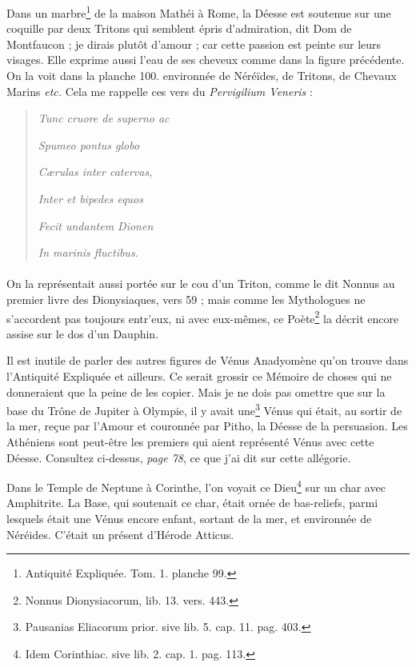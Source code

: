 \documentclass[a4paper, 18pt, oneside]{article}
\begin{document}
Dans un marbre\footnote{Antiquité Expliquée. Tom. 1. planche 99.} de la maison Mathéi à Rome, la Déesse est soutenue sur une coquille par deux Tritons qui semblent épris d'admiration, dit Dom de Montfaucon ; je dirais plutôt d'amour ; car cette passion est peinte sur leurs visages. Elle exprime aussi l'eau de ses cheveux comme dans la figure précédente. On la voit dans la planche 100. environnée de Néréïdes, de Tritons, de Chevaux Marins \emph{etc.} Cela me rappelle ces vers du \emph{Pervigilium Veneris} :
\begin{quotation}
\emph{Tunc cruore de superno ac}

\hspace*{5mm}\emph{Spumeo pontus globo}

\emph{Cærulas inter catervas,}

\hspace*{5mm}\emph{Inter et bipedes equos}

\emph{Fecit undantem Dionen}

\hspace*{5mm}\emph{In marinis fluctibus.}
\end{quotation}
\paragraph{}
On la représentait aussi portée sur le cou d'un Triton, comme le dit Nonnus au premier livre des Dionysiaques, vers 59 ; mais comme les Mythologues ne s'accordent pas toujours entr'eux, ni avec eux-mêmes, ce Poète\footnote{Nonnus Dionysiacorum, lib. 13. vers. 443.} la décrit encore assise sur le dos d'un Dauphin.

Il est inutile de parler des autres figures de Vénus Anadyomène qu'on trouve dans l'Antiquité Expliquée et ailleurs. Ce serait grossir ce Mémoire de choses qui ne donneraient que la peine de les copier. Mais je ne dois pas omettre que sur la base du Trône de Jupiter à Olympie, il y avait une\footnote{Pausanias Eliacorum prior. sive lib. 5. cap. 11. pag. 403.} Vénus qui était, au sortir de la mer, reçue par l'Amour et couronnée par Pitho, la Déesse de la persuasion. Les Athéniens sont peut-être les premiers qui aient représenté Vénus avec cette Déesse. Consultez ci-dessus, \emph{page 78}, ce que j'ai dit sur cette allégorie.

Dans le Temple de Neptune à Corinthe, l'on voyait ce Dieu\footnote{Idem Corinthiac. sive lib. 2. cap. 1. pag. 113.} sur un char avec Amphitrite. La Base, qui soutenait ce char, était ornée de bas-reliefs, parmi lesquels était une Vénus encore enfant, sortant de la mer, et environnée de Néréides. C'était un présent d'Hérode Atticus.
\end{document}
